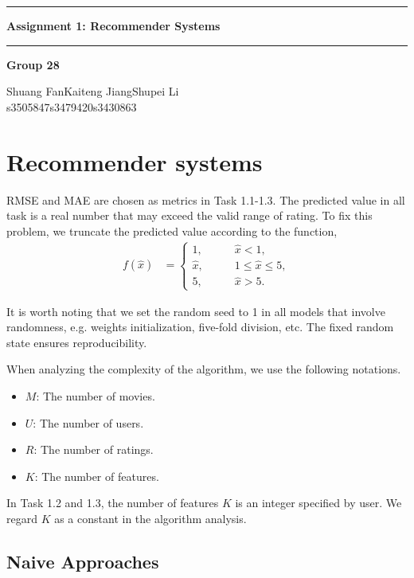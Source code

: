 \documentclass[12pt]{article}
\begin{document}
\noindent\rule{\textwidth}{1pt}
\begin{center}
    \LARGE \textbf{Assignment 1: Recommender Systems}
\end{center}
\noindent\rule{\textwidth}{0.5pt}
\begin{center}
    \textbf{Group 28}\par
    \vspace{0.3cm}
Shuang Fan\phantom{space}Kaiteng Jiang\phantom{space}Shupei Li\\
s3505847\phantom{spacespac}s3479420\phantom{spacespa}s3430863
\end{center}
\section{Recommender systems}
RMSE and MAE are chosen as metrics in Task 1.1-1.3. The predicted value in all task is a real number that may exceed the valid range of rating. To fix this problem, we truncate the predicted value according to the function,
\begin{align*}
    f(\hat{x}) &= 
    \begin{cases}
        1,\qquad &\hat{x} < 1,\\
        \hat{x},\qquad &1\leq \hat{x} \leq 5,\\
        5, \qquad &\hat{x} > 5.
    \end{cases}
\end{align*}
\par
It is worth noting that we set the random seed to 1 in all models that involve randomness, e.g. weights initialization, five-fold division, etc. The fixed random state ensures reproducibility.\par
When analyzing the complexity of the algorithm, we use the following notations.
\begin{itemize}
    \item $M$: The number of movies.
    \item $U$: The number of users.
    \item $R$: The number of ratings.
    \item $K$: The number of features.
\end{itemize}
In Task 1.2 and 1.3, the number of features $K$ is an integer specified by user. We regard $K$ as a constant in the algorithm analysis.\par

\subsection{Naive Approaches}
\end{document}
